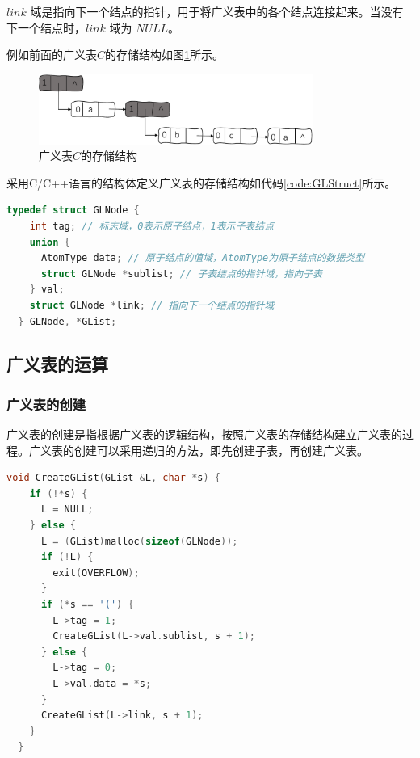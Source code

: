 \documentclass[lang=cn,newtx,10pt,scheme=chinese]{../elegantbook}
\begin{document}
  $link$ 域是指向下一个结点的指针，用于将广义表中的各个结点连接起来。当没有下一个结点时，$link$ 域为 $NULL$。

  例如前面的广义表$C$的存储结构如图\ref{fig:GLStructGraph}所示。

  \begin{figure}[h!]
    \centering
    \includegraphics[width=0.8\textwidth]{./figure/pdf/cropped/GLStructGraph.pdf}
    \caption{广义表$C$的存储结构}
    \label{fig:GLStructGraph}
  \end{figure}


  采用C/C++语言的结构体定义广义表的存储结构如代码\ref{code:GLStruct}所示。

  \begin{lstlisting}[language=C++, caption={广义表的存储结构}, label={code:GLStruct}]
  typedef struct GLNode {
    int tag; // 标志域，0表示原子结点，1表示子表结点
    union {
      AtomType data; // 原子结点的值域，AtomType为原子结点的数据类型
      struct GLNode *sublist; // 子表结点的指针域，指向子表
    } val;
    struct GLNode *link; // 指向下一个结点的指针域
  } GLNode, *GList;
  \end{lstlisting}

\subsection{广义表的运算}

\subsubsection{广义表的创建}

广义表的创建是指根据广义表的逻辑结构，按照广义表的存储结构建立广义表的过程。广义表的创建可以采用递归的方法，即先创建子表，再创建广义表。

\begin{lstlisting}[language=C++, caption={广义表的创建}]
  void CreateGList(GList &L, char *s) {
    if (!*s) {
      L = NULL;
    } else {
      L = (GList)malloc(sizeof(GLNode));
      if (!L) {
        exit(OVERFLOW);
      }
      if (*s == '(') {
        L->tag = 1;
        CreateGList(L->val.sublist, s + 1);
      } else {
        L->tag = 0;
        L->val.data = *s;
      }
      CreateGList(L->link, s + 1);
    }
  }
\end{lstlisting}
\end{document}
